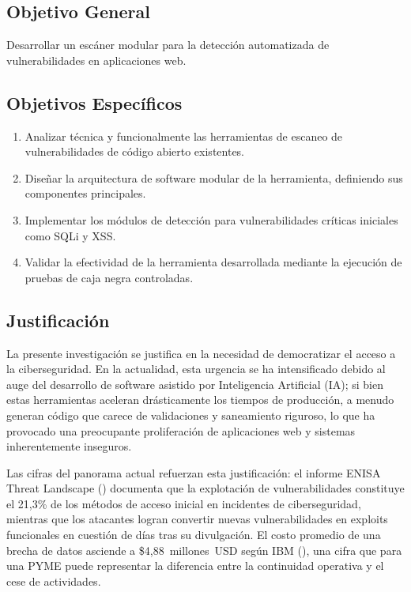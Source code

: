 \documentclass[12pt, a4paper]{article}
\begin{document}
\subsection{Objetivo General}

Desarrollar un escáner modular para la detección automatizada de vulnerabilidades
en aplicaciones web.

\subsection{Objetivos Específicos}

\begin{enumerate}
    \item Analizar técnica y funcionalmente las herramientas de escaneo de
    vulnerabilidades de código abierto existentes.

    \item Diseñar la arquitectura de software modular de la herramienta,
    definiendo sus componentes principales.

    \item Implementar los módulos de detección para vulnerabilidades críticas
    iniciales como SQLi y XSS.

    \item Validar la efectividad de la herramienta desarrollada mediante la
    ejecución de pruebas de caja negra controladas.
\end{enumerate}

\subsection{Justificación}

La presente investigación se justifica en la necesidad de democratizar el acceso
a la ciberseguridad. En la actualidad, esta urgencia se ha intensificado debido
al auge del desarrollo de software asistido por Inteligencia Artificial (IA);
si bien estas herramientas aceleran drásticamente los tiempos de producción, a
menudo generan código que carece de validaciones y saneamiento riguroso, lo que
ha provocado una preocupante proliferación de aplicaciones web y sistemas
inherentemente inseguros.

Las cifras del panorama actual refuerzan esta justificación: el informe ENISA
Threat Landscape (\cite{enisa2025}) documenta que la explotación de
vulnerabilidades constituye el 21,3\% de los métodos de acceso inicial en
incidentes de ciberseguridad, mientras que los atacantes logran convertir nuevas
vulnerabilidades en exploits funcionales en cuestión de días tras su divulgación.
El costo promedio de una brecha de datos asciende a \$4,88~millones~USD según IBM
(\cite{ibm2024}), una cifra que para una PYME puede representar la diferencia
entre la continuidad operativa y el cese de actividades.
\end{document}
